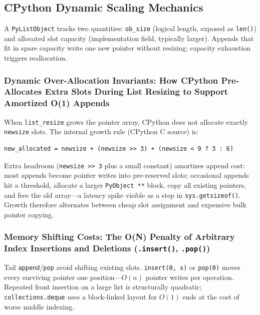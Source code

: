 \subsection{CPython Dynamic Scaling Mechanics}

A \texttt{PyListObject} tracks two quantities: \texttt{ob\_size} (logical length, exposed as \texttt{len()}) and allocated slot capacity (implementation field, typically larger). Appends that fit in spare capacity write one new pointer without resizing; capacity exhaustion triggers reallocation.

\subsubsection{Dynamic Over-Allocation Invariants: How CPython Pre-Allocates Extra Slots During List Resizing to Support Amortized O(1) Appends}

When \texttt{list\_resize} grows the pointer array, CPython does not allocate exactly \texttt{newsize} slots. The internal growth rule (CPython C source) is:

\begin{verbatim}
new_allocated = newsize + (newsize >> 3) + (newsize < 9 ? 3 : 6)
\end{verbatim}

Extra headroom (\texttt{newsize >> 3} plus a small constant) amortizes append cost: most appends become pointer writes into pre-reserved slots; occasional appends hit a threshold, allocate a larger \texttt{PyObject **} block, copy all existing pointers, and free the old array---a latency spike visible as a step in \texttt{sys.getsizeof()}. Growth therefore alternates between cheap slot assignment and expensive bulk pointer copying.

\subsubsection{Memory Shifting Costs: The O(N) Penalty of Arbitrary Index Insertions and Deletions (\texttt{.insert()}, \texttt{.pop()})}

Tail \texttt{append}/\texttt{pop} avoid shifting existing slots. \texttt{insert(0, x)} or \texttt{pop(0)} moves every surviving pointer one position---$O(n)$ pointer writes per operation. Repeated front insertion on a large list is structurally quadratic; \texttt{collections.deque} uses a block-linked layout for $O(1)$ ends at the cost of worse middle indexing.
